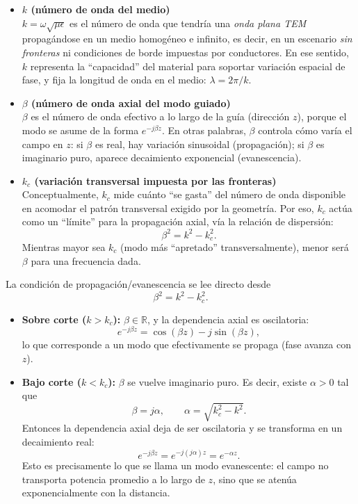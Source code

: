 \documentclass[
  11pt,
  letterpaper,
   addpoints,
   answers
  ]{exam}
\begin{document}
\begin{questions}
\begin{parts}
\begin{subparts}
\begin{solution}

\begin{itemize}
\item \textbf{$k$ (número de onda del medio)} \\
$k=\omega\sqrt{\mu\epsilon}$ es el número de onda que tendría una \emph{onda plana TEM} propagándose en un medio homogéneo e infinito,
es decir, en un escenario \emph{sin fronteras} ni condiciones de borde impuestas por conductores. En ese sentido, $k$ representa la ``capacidad''
del material para soportar variación espacial de fase, y fija la longitud de onda en el medio: $\lambda=2\pi/k$.

\item \textbf{$\beta$ (número de onda axial del modo guiado)} \\
$\beta$ es el número de onda efectivo a lo largo de la guía (dirección $z$), porque el modo se asume de la forma
$e^{-j\beta z}$. En otras palabras, $\beta$ controla cómo varía el campo en $z$:
si $\beta$ es real, hay variación sinusoidal (propagación); si $\beta$ es imaginario puro, aparece decaimiento exponencial (evanescencia).

\item \textbf{$k_c$ (variación transversal impuesta por las fronteras)} \\
Conceptualmente, $k_c$ mide cuánto ``se gasta'' del número de onda disponible en acomodar el patrón transversal exigido por la geometría.
Por eso, $k_c$ actúa como un ``límite'' para la propagación axial, vía la relación de dispersión:
\[
\beta^2=k^2-k_c^2.
\]
Mientras mayor sea $k_c$ (modo más ``apretado'' transversalmente), menor será $\beta$ para una frecuencia dada.

\end{itemize}

\vspace{6pt}
\noindent
La condición de propagación/evanescencia se lee directo desde
\[
\beta^2=k^2-k_c^2.
\]
\begin{itemize}
\item \textbf{Sobre corte ($k>k_c$):} $\beta\in\mathbb{R}$, y la dependencia axial es oscilatoria:
\[
e^{-j\beta z}=\cos(\beta z)-j\sin(\beta z),
\]
lo que corresponde a un modo que  efectivamente se propaga (fase avanza con $z$).

\item \textbf{Bajo corte ($k<k_c$):} $\beta$ se vuelve imaginario puro. Es decir, existe $\alpha>0$ tal que
\[
\beta=j\alpha,\qquad \alpha=\sqrt{k_c^2-k^2}.
\]
Entonces la dependencia axial deja de ser oscilatoria y se transforma en un decaimiento real:
\[
e^{-j\beta z}=e^{-j(j\alpha)z}=e^{-\alpha z}.
\]
Esto es precisamente lo que se llama un modo evanescente: el campo no transporta potencia promedio a lo largo de $z$,
sino que se atenúa exponencialmente con la distancia. 


\end{itemize}
\end{solution}
\end{subparts}
\end{parts}
\end{questions}
\end{document}
